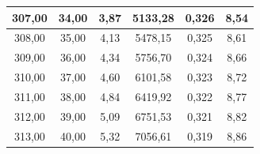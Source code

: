 \documentclass[11pt]{article}
\begin{document}
\begin{table}[H]
\begin{tabular}{|c|c|c|c|c|c|}
307,00 & 34,00            & 3,87           & 5133,28 & 0,326           & 8,54    \\ \hline
308,00 & 35,00            & 4,13           & 5478,15 & 0,325           & 8,61    \\ \hline
309,00 & 36,00            & 4,34           & 5756,70 & 0,324           & 8,66    \\ \hline
310,00 & 37,00            & 4,60           & 6101,58 & 0,323           & 8,72    \\ \hline
311,00 & 38,00            & 4,84           & 6419,92 & 0,322           & 8,77    \\ \hline
312,00 & 39,00            & 5,09           & 6751,53 & 0,321           & 8,82    \\ \hline
313,00 & 40,00            & 5,32           & 7056,61 & 0,319           & 8,86    \\ \hline
\end{tabular}
\end{table}
\end{document}
